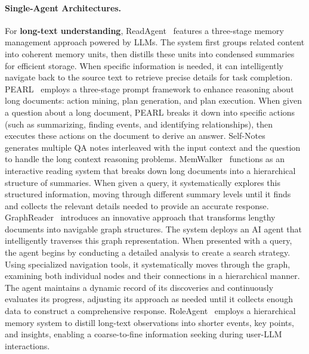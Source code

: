 \documentclass[11pt, a4paper, logo, copyright, nonumbering]{map}
\begin{document}
\paragraph{Single-Agent Architectures.} 
For \textbf{long-text understanding}, 
ReadAgent~\citep{readagent} features a three-stage memory management approach powered by LLMs. The system first groups related content into coherent memory units, then distills these units into condensed summaries for efficient storage. When specific information is needed, it can intelligently navigate back to the source text to retrieve precise details for task completion. 
PEARL~\citep{pearl} employs a three-stage prompt framework to enhance reasoning about long documents: action mining, plan generation, and plan execution. When given a question about a long document, PEARL breaks it down into specific actions (such as summarizing, finding events, and identifying relationships), then executes these actions on the document to derive an answer. 
Self-Notes~\citep{self-notes} generates multiple QA notes interleaved with the input context and the question to handle the long context reasoning problems. 
MemWalker~\citep{memwalker} functions as an interactive reading system that breaks down long documents into a hierarchical structure of summaries. When given a query, it systematically explores this structured information, moving through different summary levels until it finds and collects the relevant details needed to provide an accurate response. 
GraphReader~\citep{graphreader} introduces an innovative approach that transforms lengthy documents into navigable graph structures. The system deploys an AI agent that intelligently traverses this graph representation. When presented with a query, the agent begins by conducting a detailed analysis to create a search strategy. Using specialized navigation tools, it systematically moves through the graph, examining both individual nodes and their connections in a hierarchical manner. The agent maintains a dynamic record of its discoveries and continuously evaluates its progress, adjusting its approach as needed until it collects enough data to construct a comprehensive response. 
RoleAgent~\citep{liu2024roleagent} employs a hierarchical memory system to distill long-text observations into shorter events, key points, and insights, enabling a coarse-to-fine information seeking during user-LLM interactions.
\end{document}
